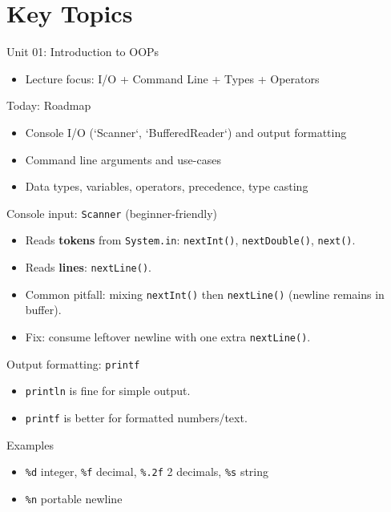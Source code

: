 \documentclass{beamer}
\begin{document}
\section{Key Topics}
\label{sec:concepts}

\begin{frame}{Unit 01: Introduction to OOPs}
  \begin{itemize}[<+->]
    \item Lecture focus: I/O + Command Line + Types + Operators
  \end{itemize}
  \slidesources{\OOPSUnitISources}
\end{frame}

\begin{frame}{Today: Roadmap}
  \begin{itemize}[<+->]
    \item Console I/O (`Scanner`, `BufferedReader`) and output formatting
    \item Command line arguments and use-cases
    \item Data types, variables, operators, precedence, type casting
  \end{itemize}
  \slidesources{\OOPSUnitISources}
\end{frame}

\begin{frame}{Console input: \texttt{Scanner} (beginner-friendly)}
  \begin{itemize}[<+->]
    \item Reads \textbf{tokens} from \texttt{System.in}: \texttt{nextInt()}, \texttt{nextDouble()}, \texttt{next()}.
    \item Reads \textbf{lines}: \texttt{nextLine()}.
    \item Common pitfall: mixing \texttt{nextInt()} then \texttt{nextLine()} (newline remains in buffer).
    \item Fix: consume leftover newline with one extra \texttt{nextLine()}.
  \end{itemize}
  \slidesources{\OOPSUnitISources}
\end{frame}

\begin{frame}{Output formatting: \texttt{printf}}
  \begin{itemize}[<+->]
    \item \texttt{println} is fine for simple output.
    \item \texttt{printf} is better for formatted numbers/text.
  \end{itemize}
  \begin{block}{Examples}
    \begin{itemize}
      \item \texttt{\%d} integer,\; \texttt{\%f} decimal,\; \texttt{\%.2f} 2 decimals,\; \texttt{\%s} string
      \item \texttt{\%n} portable newline
    \end{itemize}
  \end{block}
  \slidesources{\OOPSUnitISources}
\end{frame}
\end{document}
